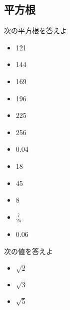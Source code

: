 \documentclass[10pt]{jsarticle}
\begin{document}
\subsection{平方根}
\begin{itembox}[l]{次の平方根を答えよ}
	\begin{Large}
		\begin{multicols}{3}
			\begin{itemize}
				\item 121
				\item 144
				\item 169
				\item 196
				\item 225
				\item 256
				\item 0.04
				\item 18
				\item 45
				\item 8
				\item $\frac{7}{25}$
				\item 0.06
			\end{itemize}
		\end{multicols}
	\end{Large}
\end{itembox}

\begin{itembox}[l]{次の値を答えよ}
	\begin{Large}
		\begin{multicols}{3}
			\begin{itemize}
				\item $\sqrt{2}$
				\item $\sqrt{3}$
				\item $\sqrt{5}$
			\end{itemize}
		\end{multicols}
	\end{Large}
\end{itembox}
\end{document}
